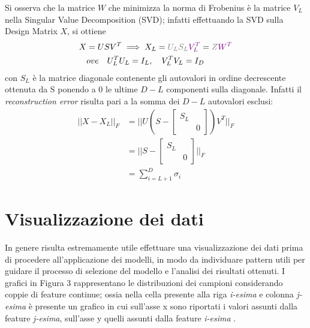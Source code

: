 \documentclass[a4paper,8pt]{article}
\begin{document}
\begin{multicols}{2}
Si osserva che la matrice $W$ che minimizza la norma di Frobenius è la matrice $V_L$ nella Singular Value Decomposition (SVD); infatti effettuando la SVD sulla Design Matrix $X$, si ottiene
\begin{equation}
\begin{split}
X &= USV^T
\implies
X_L = \color{gray}U_LS_L\color{violet}V_L^T\color{black} = \color{gray}Z\color{violet}W^T\color{black}\\
&ove\quad U_L^TU_L = I_L, \quad V_L^TV_L = I_D
\end{split}
\end{equation} 
con $S_L$ è la matrice diagonale contenente gli autovalori in ordine decrescente ottenuta da S ponendo a 0 le ultime $D-L$ componenti sulla diagonale. Infatti il \emph{reconstruction error} risulta pari a la somma dei $D - L$ autovalori esclusi:
\begin{equation}
\begin{split}
||X - X_L||_F &= ||U(S- \begin{bmatrix}
       S_L &     \\[0.3em]
          & 0  
     \end{bmatrix}) V^T ||_F\\ 
    &=||S- \begin{bmatrix}
       S_L &     \\[0.3em]
          & 0  
     \end{bmatrix} ||_F\\
     &=\sum_{i=L+1}^{D} \sigma_i
\end{split}
\end{equation}

\section{Visualizzazione dei dati}
In genere risulta estremamente utile effettuare una visualizzazione dei dati prima di procedere all'applicazione dei modelli, in modo da individuare pattern utili per guidare il processo di selezione del modello e l'analisi dei risultati ottenuti. I grafici in Figura 3 rappresentano le distribuzioni dei campioni considerando coppie di feature continue; ossia nella cella presente alla riga \emph{i-esima} e colonna \emph{j-esima} è presente un grafico in cui sull'asse x sono riportati i valori assunti dalla feature \emph{j-esima}, sull'asse y quelli assunti dalla feature \emph{i-esima} .


\end{multicols}
\end{document}
